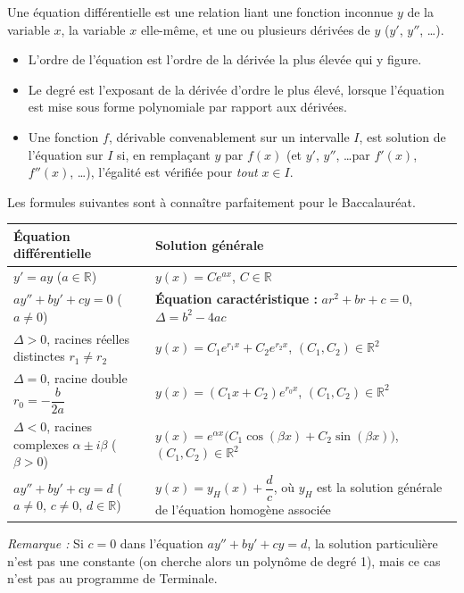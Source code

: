 \documentclass[11pt]{article}
\newcommand{\cle}[1]{{\popxbold\color{popdark}#1}}
\begin{document}
\begin{definition}
Une \cle{équation différentielle} est une relation liant une fonction inconnue $y$ de la variable $x$, la variable $x$ elle-même, et une ou plusieurs dérivées de $y$ ($y'$, $y''$, \dots).
\begin{itemize}
  \item L'\cle{ordre} de l'équation est l'ordre de la dérivée la plus élevée qui y figure.
  \item Le \cle{degré} est l'exposant de la dérivée d'ordre le plus élevé, lorsque l'équation est mise sous forme polynomiale par rapport aux dérivées.
  \item Une fonction $f$, dérivable convenablement sur un intervalle $I$, est \cle{solution} de l'équation sur $I$ si, en remplaçant $y$ par $f(x)$ (et $y'$, $y''$, \dots par $f'(x)$, $f''(x)$, \dots), l'égalité est vérifiée pour \emph{tout} $x \in I$.
\end{itemize}
\end{definition}

\begin{propriete}
Les formules suivantes sont à connaître parfaitement pour le Baccalauréat.
\begin{center}
\begin{tabularx}{\linewidth}{|l|X|}
\hline
\rowcolor{popblueL} \textbf{Équation différentielle} & \textbf{Solution générale} \\
\hline
$y' = a y$ \quad ($a \in \mathbb{R}$) & $y(x) = C e^{a x}$, \quad $C \in \mathbb{R}$ \\
\hline
$ay'' + by' + cy = 0$ \quad ($a \neq 0$) & \textbf{Équation caractéristique :} $ar^2 + br + c = 0$, $\Delta = b^2 - 4ac$ \\
\hline
$\Delta > 0$, racines réelles distinctes $r_1 \neq r_2$ & $y(x) = C_1 e^{r_1 x} + C_2 e^{r_2 x}$, \quad $(C_1, C_2) \in \mathbb{R}^2$ \\
\hline
$\Delta = 0$, racine double $r_0 = -\dfrac{b}{2a}$ & $y(x) = (C_1 x + C_2) e^{r_0 x}$, \quad $(C_1, C_2) \in \mathbb{R}^2$ \\
\hline
$\Delta < 0$, racines complexes $\alpha \pm i \beta$ \quad ($\beta > 0$) & $y(x) = e^{\alpha x} \bigl( C_1 \cos(\beta x) + C_2 \sin(\beta x) \bigr)$, \quad $(C_1, C_2) \in \mathbb{R}^2$ \\
\hline
$ay'' + by' + cy = d$ \quad ($a \neq 0$, $c \neq 0$, $d \in \mathbb{R}$) & $y(x) = y_H(x) + \dfrac{d}{c}$, où $y_H$ est la solution générale de l'équation homogène associée \\
\hline
\end{tabularx}
\end{center}
\emph{Remarque :} Si $c = 0$ dans l'équation $ay''+by'+cy=d$, la solution particulière n'est pas une constante (on cherche alors un polynôme de degré 1), mais ce cas n'est pas au programme de Terminale.
\end{propriete}
\end{document}
